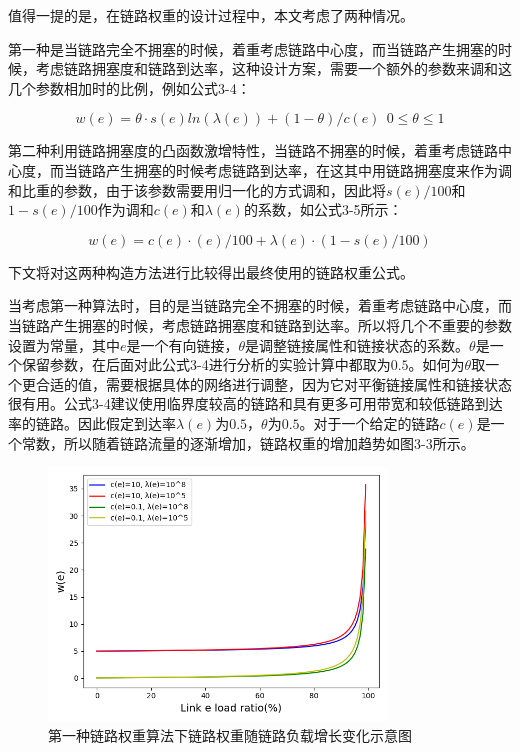 值得一提的是，在链路权重的设计过程中，本文考虑了两种情况。

第一种是当链路完全不拥塞的时候，着重考虑链路中心度，而当链路产生拥塞的时候，考虑链路拥塞度和链路到达率，这种设计方案，需要一个额外的参数来调和这几个参数相加时的比例，例如公式3-4：

\begin{equation} \label{first link weight equation}
    w(e)=\theta \cdot s(e)ln(λ(e)) +(1- \theta )/c(e) \ \  0 \le \theta \le 1
\end{equation}

第二种利用链路拥塞度的凸函数激增特性，当链路不拥塞的时候，着重考虑链路中心度，而当链路产生拥塞的时候考虑链路到达率，在这其中用链路拥塞度来作为调和比重的参数，由于该参数需要用归一化的方式调和，因此将$s(e)/100$和$1-s(e)/100$作为调和$c(e)$和$\lambda(e)$的系数，如公式3-5所示：

\begin{equation} \label{second link weight equation}
    w(e) = c(e) \cdot (e)/100 + \lambda(e) \cdot (1-s(e)/100)
\end{equation}

下文将对这两种构造方法进行比较得出最终使用的链路权重公式。

当考虑第一种算法时，目的是当链路完全不拥塞的时候，着重考虑链路中心度，而当链路产生拥塞的时候，考虑链路拥塞度和链路到达率。所以将几个不重要的参数设置为常量，其中$e$是一个有向链接，$\theta$是调整链接属性和链接状态的系数。$\theta$是一个保留参数，在后面对此公式3-4进行分析的实验计算中都取为$0.5$。如何为$\theta$取一个更合适的值，需要根据具体的网络进行调整，因为它对平衡链接属性和链接状态很有用。公式3-4建议使用临界度较高的链路和具有更多可用带宽和较低链路到达率的链路。因此假定到达率$\lambda\left(e\right)$为$0.5$，$\theta$为$0.5$。对于一个给定的链路$c\left(e\right)$是一个常数，所以随着链路流量的逐渐增加，链路权重的增加趋势如图3-3所示。

\begin{figure}[htbp]
\setlength{\abovecaptionskip}{15pt plus 3pt minus 2pt}
\centerline{\includegraphics[width=0.8\textwidth]{./figures/ch3-link-weight-function-1.png}}
\caption{第一种链路权重算法下链路权重随链路负载增长变化示意图}
\label{fig-ch3-link-weight-function-1}
\end{figure}

